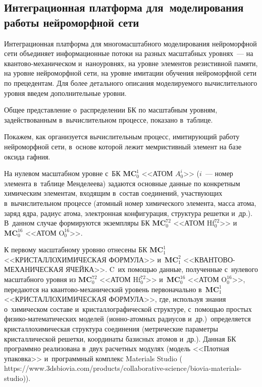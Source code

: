 \begin{multicols}{2}
\section{Интеграционная платформа для~моделирования 
работы нейроморфной сети}
 
    Интеграционная платформа для мно\-го\-мас\-штабного моделирования 
нейроморфной сети объединяет информационные потоки на разных мас\-штаб\-ных 
уровнях~--- на кван\-то\-во-ме\-ха\-ни\-че\-ском и~наноуровнях, на уровне 
элементов резистивной памяти, на уровне нейроморфной сети, на уровне 
имитации обучения нейроморфной сети по прецедентам. Для более детального 
описания моделируемого вы\-чис\-ли\-тель\-но\-го уровня введем дополнительные 
уровни.

    Общее представление о~распределении БК 
по масштабным уровням, задействованным в~вы\-чис\-ли\-тель\-ном процессе, 
показано в~таблице. 

   Покажем, как организуется вычислительным процесс, имитирующий работу 
нейроморфной сети, в~основе которой лежит мемристивный элемент на базе 
оксида гафния.
   
    На нулевом масштабном уровне с~БК $\mathbf{MC}_0^1$ <<АТОМ $A_0^i$>> ($i$~--- номер элемента 
в~таблице Менделеева) задаются основные данные по конкретным химическим 
элементам, входящим в~состав соединений, участвующих в~вычислительном 
процессе (атомный номер химического элемента, масса атома, заряд ядра, радиус 
атома, электронная конфигурация, структура решетки и~др.). В~данном случае 
формируются экземпляры БК 
$\mathbf{MC}_0^{72}$ <<АТОМ $\mathrm{Hf}_0^{72}$>> и~$\mathbf{MC}_0^{16}$ 
<<АТОМ $\mathrm{O}_0^{16}$>>.

    К первому масштабному уровню отнесены БК
$\mathbf{MC}_1^1$ <<КРИСТАЛЛОХИМИЧЕСКАЯ ФОРМУЛА>> 
и~$\mathbf{MC}_1^2$ <<КВАН\-ТО\-ВО-МЕ\-ХА\-НИ\-ЧЕ\-СКАЯ ЯЧЕЙКА>>. C~их по\-мощью 
данные, полученные с~нулевого масштабного уровня из 
$\mathbf{MC}_0^{72}$ <<АТОМ $\mathrm{Hf}_0^{72}$>> и~$\mathbf{MC}_0^{16}$ 
<<АТОМ $\mathrm{O}_0^{16}$>>, передаются на кван\-то\-во-ме\-ха\-ни\-че\-ский уровень 
первоначально в~$\mathbf{MC}_1^1$ <<КРИСТАЛЛОХИМИЧЕСКАЯ ФОРМУЛА>>, 
где, используя знания о~химическом составе и~кристаллографической структуре, 
с~помощью простых фи\-зи\-ко-ма\-те\-ма\-ти\-че\-ских моделей 
(ион\-но-атом\-ных радиусов и~др.)\ определяется кристаллохимическая структура соединения 
(метрические параметры крис\-тал\-ли\-че\-ской решетки, координаты базисных атомов 
и~др.). Данная БК программно реализована в~двух расчетных модулях (модель 
<<Плотная упаковка>> и~программный комплекс Materials Studio ({\sf 
https://www.3dsbiovia.com/products/collaborative-science/biovia-materials-studio})).
     

\end{multicols}

